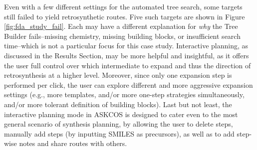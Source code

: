 \documentclass[pdflatex,sn-mathphys-num]{sn-jnl}%
\theoremstyle{thmstyleone}%
\theoremstyle{thmstyletwo}%
\theoremstyle{thmstylethree}%
\begin{document}
Even with a few different settings for the automated tree search, some targets still failed to yield retrosynthetic routes. Five such targets are shown in Figure \ref{fig:fda_study_fail}. Each may have a different explanation for \emph{why} the Tree Builder fails--missing chemistry, missing building blocks, or insufficient search time--which is not a particular focus for this case study. Interactive planning, as discussed in the Results Section, may be more helpful and insightful, as it offers the user full control over which intermediate to expand and thus the direction of retrosynthesis at a higher level. Moreover, since only one expansion step is performed per click, the user can explore different and more aggressive expansion settings (e.g., more templates, and/or more one-step strategies simultaneously, and/or more tolerant definition of building blocks). Last but not least, the interactive planning mode in ASKCOS is designed to cater even to the most general scenario of synthesis planning, by allowing the user to delete steps, manually add steps (by inputting SMILES as precursors), as well as to add step-wise notes and share routes with others.
\end{document}

